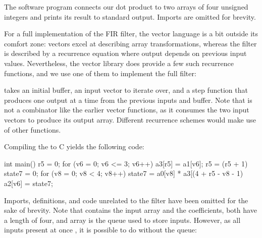 \documentclass[../paper.tex]{subfiles}
\begin{document}
\noindent The software program connects our dot product to two arrays of four unsigned integers and prints its result to standard output. Imports are omitted for brevity.

For a full implementation of the FIR filter, the vector language is a bit outside its comfort zone: vectors excel at describing array transformations, whereas the filter is described by a recurrence equation where output depends on previous input values. Nevertheless, the vector library does provide a few such recurrence functions, and we use one of them to implement the full filter:


\noindent {} takes an initial buffer, an input vector to iterate over, and a step function that produces one output at a time from the previous inputs and buffer. Note that  is not a combinator like the earlier vector functions, as it consumes the two input vectors to produce its output array. Different recurrence schemes would make use of other functions. 


Compiling the  to C yields the following code:

\begin{code}
int main() {    
  r5 = 0;
  for (v6 = 0; v6 <= 3; v6++) {
    a3[r5] = a1[v6];
    r5 = (r5 + 1) %
    state7 = 0;
    for (v8 = 0; v8 < 4; v8++)
      state7 = a0[v8] * a3[(4 + r5 - v8 - 1) %
    a2[v6] = state7;
  }
}
\end{code}

\noindent Imports, definitions, and code unrelated to the filter have been omitted for the sake of brevity. Note that  contains the input array and  the coefficients, both have a length of four, and array  is the queue used to store inputs. However, as all inputs present at once , it is possible to do without the queue:

\end{document}
